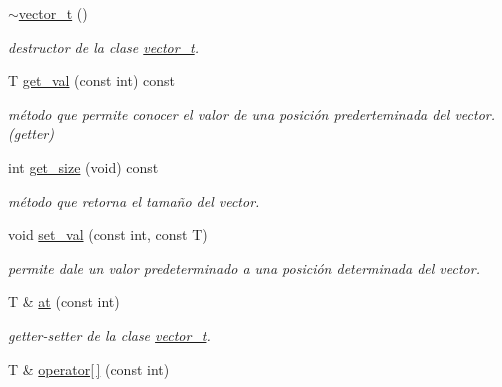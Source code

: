\begin{DoxyCompactItemize}
\hyperlink{classvector__t_aea862b224c217c1080ea72d8d6ffed5a}{$\sim$vector\+\_\+t} ()
\begin{DoxyCompactList}\small\item\em destructor de la clase \hyperlink{classvector__t}{vector\+\_\+t}. \end{DoxyCompactList}\item 
\mbox{\label{classvector__t_a25f36650ee198fb731fbc804d179b37c}} 
T \hyperlink{classvector__t_a25f36650ee198fb731fbc804d179b37c}{get\+\_\+val} (const int) const
\begin{DoxyCompactList}\small\item\em método que permite conocer el valor de una posición prederteminada del vector. (getter) \end{DoxyCompactList}\item 
\mbox{\label{classvector__t_a43b02045137da50d6fefbe6c466a9120}} 
int \hyperlink{classvector__t_a43b02045137da50d6fefbe6c466a9120}{get\+\_\+size} (void) const
\begin{DoxyCompactList}\small\item\em método que retorna el tamaño del vector. \end{DoxyCompactList}\item 
\mbox{\label{classvector__t_a9a6ad9d61d4be782d136e486bc5d46b4}} 
void \hyperlink{classvector__t_a9a6ad9d61d4be782d136e486bc5d46b4}{set\+\_\+val} (const int, const T)
\begin{DoxyCompactList}\small\item\em permite dale un valor predeterminado a una posición determinada del vector. \end{DoxyCompactList}\item 
\mbox{\label{classvector__t_a17298d70babc63ae96d134506b01568e}} 
T \& \hyperlink{classvector__t_a17298d70babc63ae96d134506b01568e}{at} (const int)
\begin{DoxyCompactList}\small\item\em getter-\/setter de la clase \hyperlink{classvector__t}{vector\+\_\+t}. \end{DoxyCompactList}\item 
\mbox{\label{classvector__t_ab2d9aa719f4c303918deed9360dae846}} 
T \& \hyperlink{classvector__t_ab2d9aa719f4c303918deed9360dae846}{operator\mbox{[}$\,$\mbox{]}} (const int)

\end{DoxyCompactItemize}
